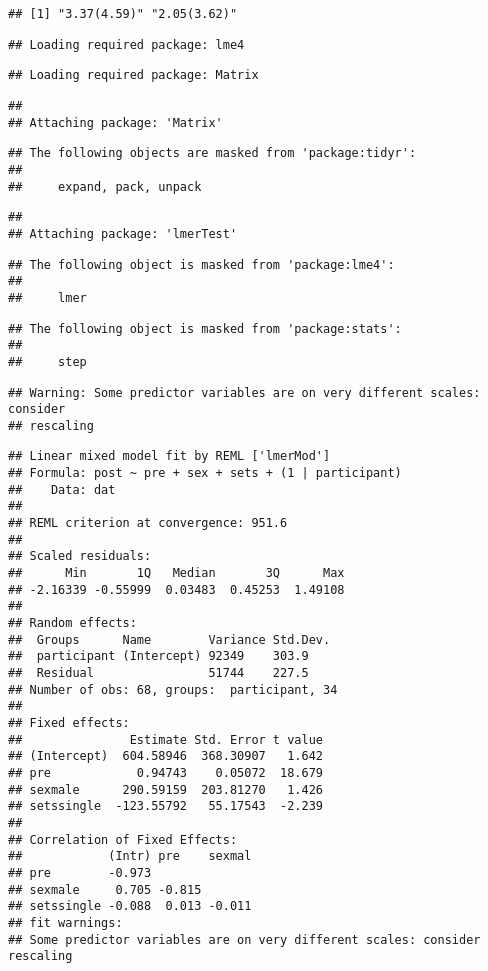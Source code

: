 \documentclass[
]{article}
\begin{document}
\begin{verbatim}
## [1] "3.37(4.59)" "2.05(3.62)"
\end{verbatim}

\begin{verbatim}
## Loading required package: lme4
\end{verbatim}

\begin{verbatim}
## Loading required package: Matrix
\end{verbatim}

\begin{verbatim}
## 
## Attaching package: 'Matrix'
\end{verbatim}

\begin{verbatim}
## The following objects are masked from 'package:tidyr':
## 
##     expand, pack, unpack
\end{verbatim}

\begin{verbatim}
## 
## Attaching package: 'lmerTest'
\end{verbatim}

\begin{verbatim}
## The following object is masked from 'package:lme4':
## 
##     lmer
\end{verbatim}

\begin{verbatim}
## The following object is masked from 'package:stats':
## 
##     step
\end{verbatim}

\begin{verbatim}
## Warning: Some predictor variables are on very different scales: consider
## rescaling
\end{verbatim}

\begin{verbatim}
## Linear mixed model fit by REML ['lmerMod']
## Formula: post ~ pre + sex + sets + (1 | participant)
##    Data: dat
## 
## REML criterion at convergence: 951.6
## 
## Scaled residuals: 
##      Min       1Q   Median       3Q      Max 
## -2.16339 -0.55999  0.03483  0.45253  1.49108 
## 
## Random effects:
##  Groups      Name        Variance Std.Dev.
##  participant (Intercept) 92349    303.9   
##  Residual                51744    227.5   
## Number of obs: 68, groups:  participant, 34
## 
## Fixed effects:
##               Estimate Std. Error t value
## (Intercept)  604.58946  368.30907   1.642
## pre            0.94743    0.05072  18.679
## sexmale      290.59159  203.81270   1.426
## setssingle  -123.55792   55.17543  -2.239
## 
## Correlation of Fixed Effects:
##            (Intr) pre    sexmal
## pre        -0.973              
## sexmale     0.705 -0.815       
## setssingle -0.088  0.013 -0.011
## fit warnings:
## Some predictor variables are on very different scales: consider rescaling
\end{verbatim}
\end{document}
